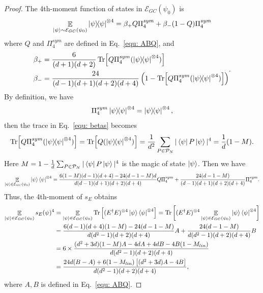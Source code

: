 \documentclass[showpacs,amsmath,amssymb,twocolumn,aps,pra,superscriptaddress,notitlepage,10pt]{revtex4-2}
\newcommand{\bE}{\mathbb E}
\newcommand{\cP}{\mathcal P}
\newcommand{\cM}{\mathcal E_{GC}}
\begin{document}
\begin{proof}
    The 4th-moment function of  states in $\cM(\psi_0)$ is \cite{zhu2016clifford}
\begin{equation}
    \mathop{\bE}_{\ket{\psi}\sim \cM(\psi_0)}  \ketbra{\psi}{\psi}^{\otimes 4}=\beta_+Q\Pi^{sym}_4+\beta_-(1-Q)\Pi^{sym}_4
\end{equation}
where $Q$ and $\Pi^{sym}_4$ are defined in Eq.~\eqref{equ: ABQ}, and
\begin{equation}
    \begin{aligned}
        \beta_+&=\frac{6}{(d+1)(d+2)}\Tr[Q\Pi_4^{sym}(\ketbra{\psi}{\psi}^{\otimes 4})]\\
        \beta_-&=\frac{24}{(d-1)(d+1)(d+2)(d+4)}\left(1-\Tr[Q\Pi_4^{sym}(\ketbra{\psi}{\psi}^{\otimes 4})]\right)
    \end{aligned}\label{equ: betas}.
\end{equation}
By definition, we have
\begin{equation}
    \Pi_4^{sym}\ketbra{\psi}{\psi}^{\otimes 4}=\ketbra{\psi}{\psi}^{\otimes 4},
\end{equation}
then the trace in Eq.~\ref{equ: betas} becomes
\begin{equation}
    \Tr[Q\Pi_4^{sym}(\ketbra{\psi}{\psi}^{\otimes 4})]=\Tr[Q(\ketbra{\psi}{\psi}^{\otimes 4})]=\frac{1}{d^2}\sum_{P\in\cP_N}|\bra{\psi}P\ket{\psi}|^4=\frac{1}{d}(1-M).
\end{equation}
Here $M=1-\frac{1}{d}\sum_{P\in\cP_N}|\bra{\psi}P\ket{\psi}|^4$ is the magic of state $\ket{\psi}$. Then we have
\begin{equation}
    \mathop{\mathbb E}_{\ket{\psi}\in\cM(\psi_0)}\ket{\psi}\bra{\psi}^{\otimes 4}=\frac{6(1-M)(d-1)(d+4)-24(d-1-M)d}{d(d-1)(d+1)(d+2)(d+4)}Q\Pi_4^{sym}+\frac{24(d-1-M)}{(d-1)(d+1)(d+2)(d+4)}\Pi_4^{sym}.
\end{equation}
Thus, the 4th-moment of $s_E$ obtains
    \begin{equation}
        \begin{aligned}
            \mathop{\bE}_{\ket{\psi}\in \cM(\psi_0)}s_E(\psi)^4&=\mathop{\bE}_{\ket{\psi}\in\cM(\psi_0)}\Tr\left[(E^\dagger E)^{\otimes 4}\ket{\psi}\bra{\psi}^{\otimes 4}\right]=\Tr\left[(E^\dagger E)^{\otimes 4}\mathop{\bE}_{\ket{\psi}\in\cM(\psi_0)}\ket{\psi}\bra{\psi}^{\otimes 4}\right]\\
            &=\frac{6(d-1)(d+4)(1-M)-24(d-1-M)}{d(d^2-1)(d+2)(d+4)}A+\frac{24(d-1-M)}{d(d^2-1)(d+2)(d+4)}B\\
            &=6\times\frac{(d^2+3d)(1-M)A-4dA+4dB-4B(1-M_{lin})}{d(d^2-1)(d+2)(d+4)}\\
            &=\frac{24d(B-A)+6(1-M_{lin})\left[(d^2+3d)A-4B\right]}{d(d^2-1)(d+2)(d+4)},
        \end{aligned}
    \end{equation}
    where $A,B$ is defined in Eq.~\eqref{equ: ABQ}.
\end{proof}
\end{document}
